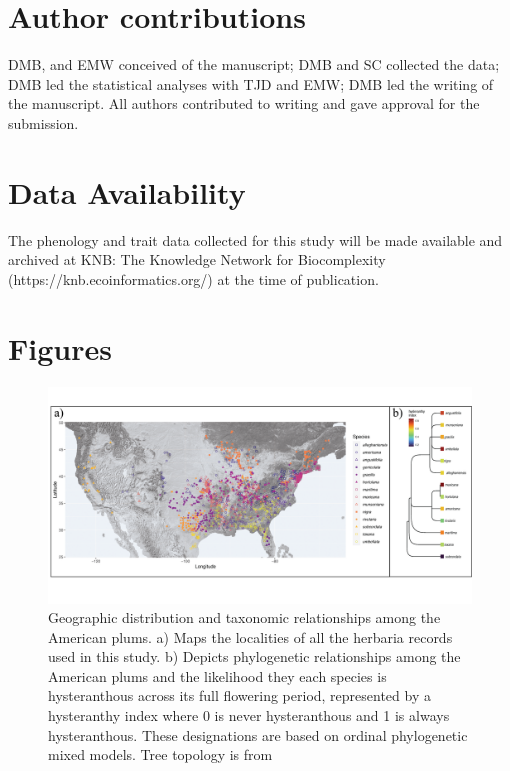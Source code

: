 \documentclass{article}[12pt]
\begin{document}
{{\section*{Author contributions}
DMB, and EMW conceived of the manuscript; DMB and SC collected the data; DMB led the statistical analyses with TJD and EMW; DMB led the writing of the manuscript. All authors contributed to writing and gave approval for the submission.

\section*{Data Availability}
The phenology and trait data collected for this study will be made available and archived at KNB: The Knowledge Network for Biocomplexity (https://knb.ecoinformatics.org/) at the time of publication.

 

\newpage
\section*{Figures}


\begin{figure}[h!]
  \centering
 \includegraphics[width=\textwidth]{..//..//Plots/fig_1.png}
    \caption{Geographic distribution and taxonomic relationships among the American plums. a) Maps the localities of all the herbaria records used in this study. b) Depicts phylogenetic relationships among the American plums and the likelihood they each species is hysteranthous across its full flowering period, represented by a hysteranthy index where 0 is never hysteranthous and 1 is always hysteranthous. These designations are based on ordinal phylogenetic mixed models. Tree topology is from \citet{Shaw:2004aa}}
    \label{fig:phylo2}
\end{figure}



}}
\end{document}
